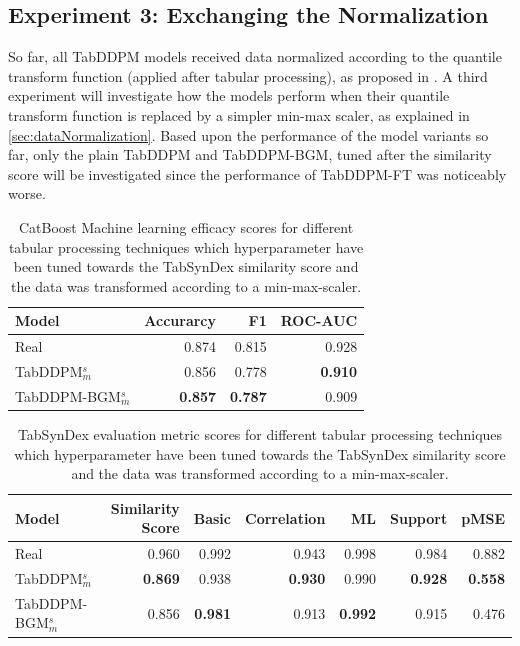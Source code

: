 \subsection{Experiment 3: Exchanging the Normalization}
\label{ch:Experiment-3}

So far, all TabDDPM models received data normalized according to the quantile transform function (applied after tabular processing), as proposed in \cite{kotelnikov2022TabDDPMModellingTabular}.
A third experiment will investigate how the models perform when their quantile transform function is replaced by a simpler min-max scaler, as explained in \autoref{sec:dataNormalization}.
Based upon the performance of the model variants so far, only the plain TabDDPM and TabDDPM-BGM, tuned after the similarity score will be investigated since the performance of 
TabDDPM-FT was noticeably worse.


\begin{table}[h]
	\centering
	\begin{tabular}{lrrr}
		\toprule
		\textbf{Model}        & \textbf{Accurarcy} & \textbf{F1}    & \textbf{ROC-AUC} \\
		\midrule
		Real                  & 0.874              & 0.815          & 0.928            \\
		TabDDPM$^{s}_{m}$     & 0.856              & 0.778          & \textbf{0.910}   \\
		TabDDPM-BGM$^{s}_{m}$ & \textbf{0.857}     & \textbf{0.787} & 0.909            \\
		\bottomrule
	\end{tabular}
	\caption[Experiment 3 ML-Efficacy]{CatBoost Machine learning efficacy scores for different tabular processing techniques which hyperparameter have been tuned towards the TabSynDex similarity score
		and the data was transformed according to a min-max-scaler.}
	\label{tab:exp3-ml}
\end{table}

\begin{table}[h]
	\centering
	\begin{tabular}{lrrrrrr}
		\toprule
		\textbf{Model}        & \textbf{Similarity Score} & \textbf{Basic} & \textbf{Correlation} & \textbf{ML}    & \textbf{Support} & \textbf{pMSE}  \\
		\midrule
		Real                  & 0.960                     & 0.992          & 0.943                & 0.998          & 0.984            & 0.882          \\
		TabDDPM$^{s}_{m}$     & \textbf{0.869}            & 0.938          & \textbf{0.930}       & 0.990          & \textbf{0.928}   & \textbf{0.558} \\
		TabDDPM-BGM$^{s}_{m}$ & 0.856                     & \textbf{0.981} & 0.913                & \textbf{0.992} & 0.915            & 0.476          \\
		\bottomrule
	\end{tabular}
	\caption[Experiment 3 TabSynDex]{TabSynDex evaluation metric scores for different tabular processing techniques which hyperparameter have been tuned towards the TabSynDex similarity score
		and the data was transformed according to a min-max-scaler.}
	\label{tab:exp3-sim}
\end{table}

